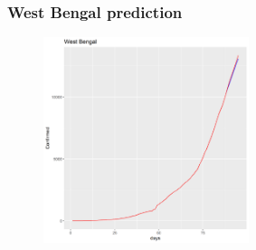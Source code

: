 \documentclass{beamer}
\begin{document}
\begin{frame}
\frametitle{West Bengal prediction}
\begin{figure}
	\includegraphics[width=\linewidth, height=6cm]{../plots/pred/normal/West Bengal_predictions_final.png}
\end{figure}
\end{frame}
\end{document}
